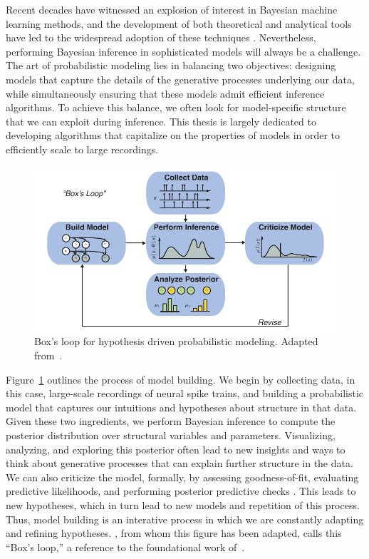 Recent decades have witnessed an explosion of interest in Bayesian
machine learning methods, and the development of both theoretical and
analytical tools have led to the widespread adoption of these
techniques \citep{bishop2006pattern, murphy2012probabilistic}.
Nevertheless, performing Bayesian inference in sophisticated models
will always be a challenge. The art of probabilistic modeling lies in
balancing two objectives: designing models that capture the details of
the generative processes underlying our data, while simultaneously
ensuring that these models admit efficient inference algorithms. To
achieve this balance, we often look for model-specific structure that
we can exploit during inference.  This thesis is largely dedicated to
developing algorithms that capitalize on the properties of models in
order to efficiently scale to large recordings.


\begin{figure}[t]
  \centering%
\includegraphics[width=5.5in]{figures/ch1/boxloop} 
\caption[Box's loop]{Box's loop for hypothesis driven probabilistic modeling.
Adapted from~\citet{blei2014build}.}
\label{fig:boxloop}
\end{figure}

Figure~\ref{fig:boxloop} outlines the process of model building.  We
begin by collecting data, in this case, large-scale recordings of
neural spike trains, and building a probabilistic model that captures
our intuitions and hypotheses about structure in that data. Given
these two ingredients, we perform Bayesian inference to compute the
posterior distribution over structural variables and
parameters. Visualizing, analyzing, and exploring this posterior often
lead to new insights and ways to think about generative processes that
can explain further structure in the data. We can also criticize the
model, formally, by assessing goodness-of-fit, evaluating predictive
likelihoods, and performing posterior predictive checks
\citep{Gelman13}. This leads to new hypotheses, which in turn lead to
new models and repetition of this process.  Thus, model building is an
interative process in which we are constantly adapting and refining
hypotheses.  \citet{blei2014build}, from whom this figure has been
adapted, calls this ``Box's loop,'' a reference to the foundational
work of~\citet{box1980sampling}.



